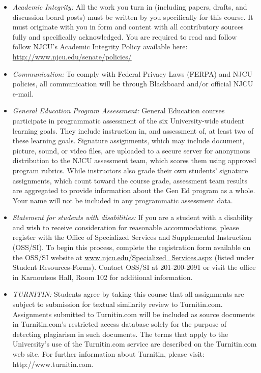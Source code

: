 \documentclass[article,oneside]{memoir}
\begin{document}
\begin{itemize}

 \item \textit{Academic Integrity:} All the work you turn in (including papers, drafts, and discussion board posts) must be written by you specifically for this course. It must originate with you in form and content with all contributory sources fully and specifically acknowledged. You are required to read and follow follow NJCU's Academic Integrity Policy available here: \href{http://www.njcu.edu/senate/policies/}{http://www.njcu.edu/senate/policies/} 

\item \textit{Communication:} To comply with Federal Privacy Laws (FERPA) and NJCU policies, all communication will be through Blackboard and/or official NJCU e-mail. 

\item \textit{General Education Program Assessment:} General Education courses participate in programmatic assessment of the six University-wide student learning goals. They include instruction in, and assessment of, at least two of these learning goals. Signature assignments, which may include document, picture, sound, or video files, are uploaded to a secure server for anonymous distribution to the NJCU assessment team, which scores them using approved program rubrics. While instructors also grade their own students’ signature assignments, which count toward the course grade, assessment team results are aggregated to provide information about the Gen Ed program as a whole. Your name will not be included in any programmatic assessment data.

\item \textit{Statement for students with disabilities:} If you are a student with a disability and wish to receive consideration for reasonable accommodations, please register with the Office of Specialized Services and Supplemental Instruction (OSS/SI). To begin this process, complete the registration form available on the OSS/SI website at
\href{http://www.njcu.edu/Specialized_Services.aspx}{www.njcu.edu/Specialized\_Services.aspx}
(listed under Student Resources-Forms). Contact OSS/SI at 201-200-2091
or visit the office in Karnoutsos Hall, Room 102 for additional
information.

\item \textit{TURNITIN:} Students agree by taking this course that all assignments are subject to submission for textual similarity review to Turnitin.com. Assignments submitted to Turnitin.com will be included as source documents in Turnitin.com’s restricted access database solely for the purpose of detecting plagiarism in such documents. The terms that apply to the University’s use of the Turnitin.com service are described on the Turnitin.com web site. For further information about Turnitin, please visit: http://www.turnitin.com.

\end{itemize}






\end{document}
